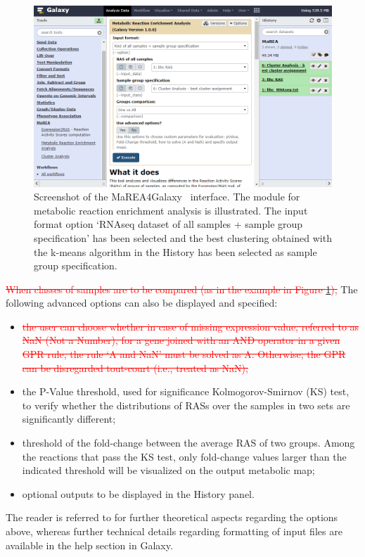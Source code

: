 \documentclass[preprint,12pt,authoryear]{elsarticle}
\newcommand{\red}{\textcolor{red}}
\newcommand{\mareagalaxy}{\textsf{MaREA4Galaxy}}
\begin{document}
\begin{figure}[ht]
  \includegraphics[width=1\textwidth]{figs/screenshot3v2q.png}
  \caption{Screenshot of the \mareagalaxy~ interface. The module for
    metabolic reaction enrichment analysis is illustrated. The input
    format option `RNAseq dataset of all samples + sample group
    specification' has been selected and the best clustering obtained
    with the k-means algorithm in the History has been selected as
    sample group specification.}
  \label{fig:screenshot3}
\end{figure}

\red{\sout{When classes of samples are to be compared (as in the
    example in Figure \ref{fig:screenshot3}),}} The following advanced
options can also be displayed and specified:
\begin{itemize}
\item \red{\sout{ the user can choose whether in case of missing
      expression value, referred to as NaN (Not a Number), for a gene
      joined with an AND operator in a given GPR rule, the rule `A and
      NaN' must be solved as A. Otherwise, the GPR can be disregarded
      tout-court (i.e., treated as NaN);}}
\item the P-Value threshold, used for significance Kolmogorov-Smirnov
  (KS) test, to verify whether the distributions of RASs over the
  samples in two sets are significantly different;
  
\item threshold of the fold-change between the average RAS of two
  groups. Among the reactions that pass the KS test,  only fold-change
  values larger than the indicated threshold will be visualized on the
  output metabolic map;
  
\item optional outputs to be displayed in the History panel.
\end{itemize}
The reader is referred to \citep{marea} for further theoretical
aspects regarding the options above, whereas further technical details
regarding formatting of input files are available in the help section
in Galaxy.
\end{document}
